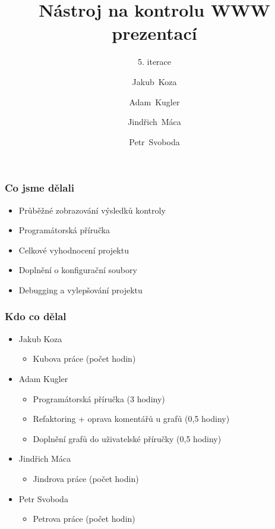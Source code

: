 \documentclass{beamer}
\begin{document}
\title [NKWP]{Nástroj na kontrolu WWW prezentací}
\author[J.~ Koza, A.~ Kugler, J.~Máca, P.~Svoboda]{Jakub~Koza \and Adam~Kugler \and Jindřich~Máca \and Petr~Svoboda}

\subtitle{5. iterace}
\frame{\titlepage}
\begin{frame}[allowframebreaks]\frametitle{Co jsme dělali}
   \begin{itemize}
    \item Průběžné zobrazování výsledků kontroly
		\item Programátorská příručka
		\item Celkové vyhodnocení projektu
		\item Doplnění o konfigurační soubory
		\item Debugging a vylepšování projektu
   \end{itemize}
\end{frame}

\begin{frame}[allowframebreaks]\frametitle{Kdo co dělal} 
  \begin{itemize}
    \item Jakub Koza
      \begin{itemize}
       \item Kubova práce (počet hodin)
     \end{itemize}

    \item Adam Kugler
      \begin{itemize}
       \item Programátorská příručka (3 hodiny)
       \item Refaktoring + oprava komentářů u grafů (0,5 hodiny)
       \item Doplnění grafů do uživatelské příručky (0,5 hodiny)
     \end{itemize}

    \item Jindřich Máca
      \begin{itemize}
       \item Jindrova práce (počet hodin)
     \end{itemize}

    \item Petr Svoboda
      \begin{itemize}
       \item Petrova práce (počet hodin)
     \end{itemize}
   \end{itemize}  
\end{frame} 
\end{document}

